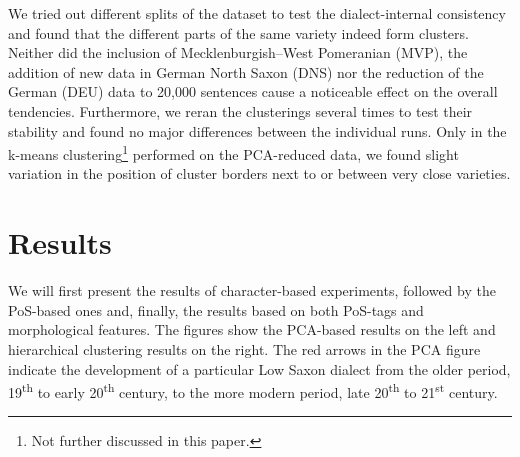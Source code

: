 \documentclass[output=paper,colorlinks,citecolor=brown]{langscibook}
\begin{document}
We tried out different splits of the dataset to test the dialect-internal consistency and found that the different parts of the same variety indeed form clusters. Neither did the inclusion of Mecklenburgish--West Pomeranian (MVP), the addition of new data in German North Saxon (DNS) nor the reduction of the German (DEU) data to 20,000 sentences cause a noticeable effect on the overall tendencies. 
Furthermore, we reran the clusterings several times to test their stability and found no major differences between the individual runs. Only in the k-means clustering\footnote{Not further discussed in this paper.} performed on the PCA-reduced data, we found slight variation in the position of cluster borders next to or between very close varieties. 





\section{Results}

We will first present the results of character-based experiments, followed by the PoS-based ones and, finally, the results based on both PoS-tags and morphological features.
The figures show the PCA-based results on the left and hierarchical clustering results on the right. The red arrows in the PCA figure indicate the development of a particular Low Saxon dialect from the older period, 19\textsuperscript{th} to early 20\textsuperscript{th} century, to the more modern period, late 20\textsuperscript{th} to 21\textsuperscript{st} century. 
\end{document}
